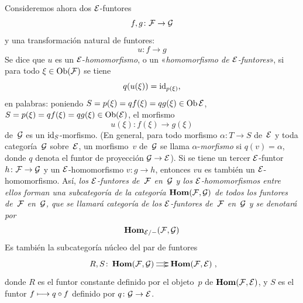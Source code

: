 Consideremos ahora dos $\cal{E}$-funtores
$$
f,g\colon \cal{F}\to\cal{G}
$$
y una transformación natural de funtores:
$$
u\colon f\to g
$$
Se dice que $u$ es un $\cal{E}$-\emph{homomorfismo}, o un
«\emph{homomorfismo de $\cal{E}$-funtores}», si para todo
$\xi\in\Ob(\cal{F})$ se tiene
$$
q(u(\xi))=\id_{p(\xi)} \quoi\text{,}
$$
en palabras: poniendo
{$S=p(\xi)=qf(\xi)=qg(\xi)\in\Ob\cal{E}$,}
{$S=p(\xi)=qf(\xi)=qg(\xi)\in\Ob(\cal{E})$,}
el morfismo
$$
u(\xi)\colon f(\xi)\to g(\xi)
$$
de~$\cal{G}$ es un $\id_S$-morfismo. (En general, para todo morfismo
$\alpha\colon T \to S$ de~$\cal{E}$ y toda categoría~$\cal{G}$ sobre~$\cal{E}$,
un morfismo~$v$ de~$\cal{G}$ se llama $\alpha$-\emph{morfismo} si
$q(v)=\alpha$, donde $q$ denota el funtor de proyección
$\cal{G}\to \cal{E}$). Si se tiene un tercer $\cal{E}$-funtor
$h\colon \cal{F}\to \cal{G}$ y un $\cal{E}$-homomorfismo $v\colon g\to h$,
entonces $vu$ es también un $\cal{E}$-homomorfismo. Así,
\emph{los $\cal{E}$-funtores de~$\cal{F}$ en~$\cal{G}$ y los
$\cal{E}$-homomorfismos entre ellos forman una subcategoría de la categoría
$\SheafHom(\cal{F},\cal{G})$ de todos los funtores de~$\cal{F}$ en~$\cal{G}$,
que se llamará categoría de los $\cal{E}$-funtores de~$\cal{F}$ en~$\cal{G}$ y
se denotará por}
$$
\SheafHom_{\cal{E}/-}(\cal{F},\cal{G})
$$
\label{indnot:fi}%
Es también la subcategoría núcleo del par de funtores
\begingroup
\shorthandoff{<>}%
$$
\xymatrix@C=.5cm{R,S\colon\SheafHom(\cal{F},\cal{G})
\ar@<2pt>[r]\ar@<-2pt>[r]&\SheafHom(\cal{F},\cal{E})}\quoi\text{,}
$$
\endgroup
donde $R$ es el funtor constante definido por el objeto~$p$ de
$\SheafHom(\cal{F},\cal{E})$, y $S$ es el funtor $f\mto q\circ f$ definido por
$q\colon\cal{G}\to\cal{E}$.

